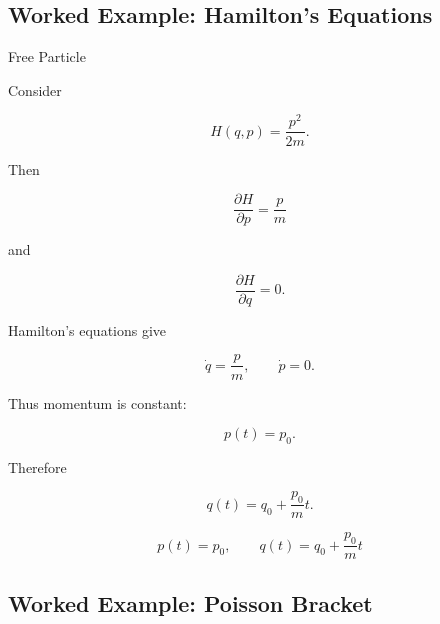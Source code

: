 \subsection{Worked Example: Hamilton's Equations}
\label{subsec:worked-hamilton-equations}

\begin{workedexamplebox}{Free Particle}

Consider

\[
H(q,p)=\frac{p^2}{2m}.
\]

Then

\[
\frac{\partial H}{\partial p}
=
\frac{p}{m}
\]

and

\[
\frac{\partial H}{\partial q}=0.
\]

Hamilton's equations give

\[
\dot q=\frac{p}{m},
\qquad
\dot p=0.
\]

Thus momentum is constant:

\[
p(t)=p_0.
\]

Therefore

\[
q(t)
=
q_0+\frac{p_0}{m}t.
\]

\begin{answerbox}
\[
\boxed{
p(t)=p_0,
\qquad
q(t)=q_0+\frac{p_0}{m}t
}
\]
\end{answerbox}
\end{workedexamplebox}

\subsection{Worked Example: Poisson Bracket}
\label{subsec:worked-poisson-bracket}


